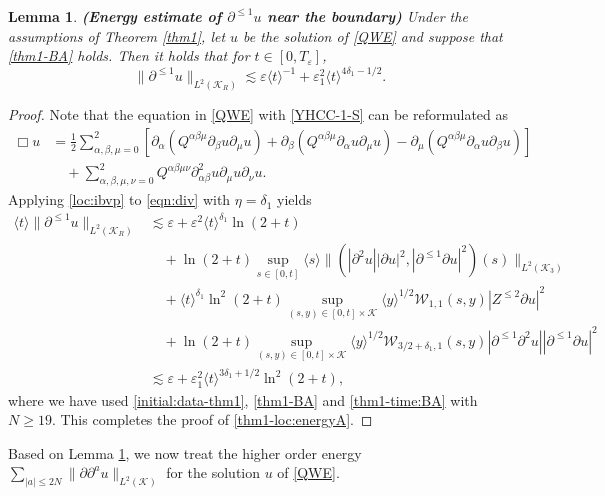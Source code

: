 \documentclass[11pt,twoside]{article}
\def\cK{\mathcal K}
\def\cW{\mathcal W}
\def\ds{\displaystyle}
\def\p{\partial}
\def\ve{\varepsilon}
\def\ls{\lesssim}
\newcommand{\w}[1]{\langle {#1} \rangle}
\theoremstyle{plain}
\newtheorem{lemma}[theorem]{Lemma}
\theoremstyle{definition}
\numberwithin{equation}{section}
\begin{document}
\begin{lemma}\label{Son-4.2}
{\bf (Energy estimate of $\p^{\le1}u$ near the boundary)}
Under the assumptions of Theorem \ref{thm1}, let $u$ be the solution of \eqref{QWE} and suppose that \eqref{thm1-BA} holds.
Then it holds that for $t\in[0,T_\ve]$,
\begin{equation}\label{thm1-loc:energyA}
\|\p^{\le1}u\|_{L^2(\cK_R)}\ls\ve\w{t}^{-1}+\ve_1^2\w{t}^{4\delta_1-1/2}.
\end{equation}
\end{lemma}
\begin{proof}
Note that  the equation in \eqref{QWE} with \eqref{YHCC-1-S} can be reformulated as
\begin{equation}\label{eqn:div}
\begin{split}
\Box u&=\frac12\sum_{\alpha,\beta,\mu=0}^2[\p_{\alpha}(Q^{\alpha\beta\mu}\p_{\beta}u\p_{\mu}u)
+\p_{\beta}(Q^{\alpha\beta\mu}\p_{\alpha}u\p_{\mu}u)
-\p_{\mu}(Q^{\alpha\beta\mu}\p_{\alpha}u\p_{\beta}u)]\\
&\quad+\sum_{\alpha,\beta,\mu,\nu=0}^2Q^{\alpha\beta\mu\nu}\p^2_{\alpha\beta}u\p_{\mu}u\p_{\nu}u.
\end{split}
\end{equation}
Applying \eqref{loc:ibvp} to \eqref{eqn:div} with $\eta=\delta_1$ yields
\begin{equation}\label{thm1-loc:energyA1}
\begin{split}
\w{t}\|\p^{\le1}u\|_{L^2(\cK_R)}&\ls\ve+\ve^2\w{t}^{\delta_1}\ln(2+t)\\
&\quad+\ln(2+t)\sup_{s\in[0,t]}\w{s}\|(|\p^2u||\p u|^2,|\p^{\le1}\p u|^2)(s)\|_{L^2(\cK_3)}\\
&\quad+\w{t}^{\delta_1}\ln^2(2+t)\sup_{(s,y)\in[0,t]\times\cK}\w{y}^{1/2}\cW_{1,1}(s,y)|Z^{\le2}\p u|^2\\
&\quad+\ln(2+t)\sup_{(s,y)\in[0,t]\times\cK}\w{y}^{1/2}\cW_{3/2+\delta_1,1}(s,y)|\p^{\le1}\p^2u||\p^{\le1}\p u|^2\\
&\ls\ve+\ve_1^2\w{t}^{3\delta_1+1/2}\ln^2(2+t),
\end{split}
\end{equation}
where we have used \eqref{initial:data-thm1}, \eqref{thm1-BA} and \eqref{thm1-time:BA} with $N\ge19$.
This completes the proof of \eqref{thm1-loc:energyA}.
\end{proof}

Based on Lemma \ref{Son-4.2}, we now treat the higher order energy $\ds\sum_{|a|\le2N}\|\p\p^au\|_{L^2(\cK)}$
for the solution $u$ of \eqref{QWE}.
\end{document}
